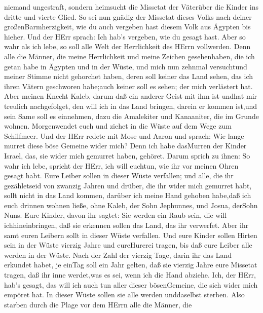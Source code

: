 niemand ungestraft, sondern heimsucht die Missetat der Väterüber die
Kinder ins dritte und vierte Glied.  So sei nun gnädig der
Missetat dieses Volks nach deiner großenBarmherzigkeit, wie du auch
vergeben hast diesem Volk aus Ägypten bis hieher.  Und der
HErr sprach: Ich hab's vergeben, wie du gesagt hast.  Aber
so wahr als ich lebe, so soll alle Welt der Herrlichkeit des HErrn
vollwerden.  Denn alle die Männer, die meine Herrlichkeit
und meine Zeichen gesehenhaben, die ich getan habe in Ägypten und in der
Wüste, und mich nun zehnmal versuchtund meiner Stimme nicht gehorchet
haben,  deren soll keiner das Land sehen, das ich ihren
Vätern geschworen habe;auch keiner soll es sehen; der mich verlästert
hat.  Aber meinen Knecht Kaleb, darum daß ein anderer Geist
mit ihm ist undhat mir treulich nachgefolget, den will ich in das Land
bringen, darein er kommen ist,und sein Same soll es einnehmen,
 dazu die Amalekiter und Kanaaniter, die im Grunde wohnen.
Morgenwendet euch und ziehet in die Wüste auf dem Wege zum Schilfmeer.
 Und der HErr redete mit Mose und Aaron und sprach:
 Wie lange murret diese böse Gemeine wider mich? Denn ich
habe dasMurren der Kinder Israel, das, sie wider mich gemurret haben,
gehöret.  Darum sprich zu ihnen: So wahr ich lebe, spricht
der HErr, ich will euchtun, wie ihr vor meinen Ohren gesagt habt.
 Eure Leiber sollen in dieser Wüste verfallen; und alle,
die ihr gezähletseid von zwanzig Jahren und drüber, die ihr wider mich
gemurret habt,  sollt nicht in das Land kommen, darüber ich
meine Hand gehoben habe,daß ich euch drinnen wohnen ließe, ohne Kaleb,
der Sohn Jephunnes, und Josua, derSohn Nuns.  Eure Kinder,
davon ihr sagtet: Sie werden ein Raub sein, die will ichhineinbringen,
daß sie erkennen sollen das Land, das ihr verwerfet.  Aber
ihr samt euren Leibern sollt in dieser Wüste verfallen. 
Und eure Kinder sollen Hirten sein in der Wüste vierzig Jahre und
eureHurerei tragen, bis daß eure Leiber alle werden in der Wüste.
 Nach der Zahl der vierzig Tage, darin ihr das Land
erkundet habet, je einTag soll ein Jahr gelten, daß sie vierzig Jahre
eure Missetat tragen, daß ihr inne werdet,was es sei, wenn ich die Hand
abziehe.  Ich, der HErr, hab's gesagt, das will ich auch
tun aller dieser bösenGemeine, die sich wider mich empöret hat. In
dieser Wüste sollen sie alle werden unddaselbst sterben. 
Also starben durch die Plage vor dem HErrn alle die Männer, die
